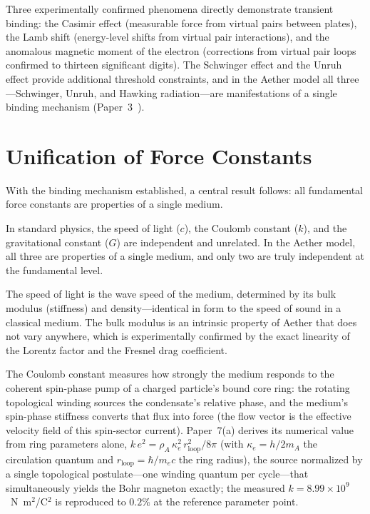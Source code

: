 \documentclass[12pt,letterpaper]{article}
\newcommand{\rhoa}{\rho_{\!A}}
\begin{document}
Three experimentally confirmed phenomena directly demonstrate transient binding:
the Casimir effect \cite{casimir1948} (measurable force from virtual pairs between
plates), the Lamb shift \cite{lamb1947} (energy-level shifts from virtual pair
interactions), and the anomalous magnetic moment of the electron (corrections from
virtual pair loops confirmed to thirteen significant digits).  The Schwinger effect
\cite{schwinger1951} and the Unruh effect \cite{unruh1976} provide additional
threshold constraints, and in the Aether model all three---Schwinger, Unruh, and
Hawking radiation---are manifestations of a single binding mechanism
(Paper~3~\cite{otto-gravity}).


\section{Unification of Force Constants}
\label{sec:force-constants}

With the binding mechanism established, a central result follows: all fundamental
force constants are properties of a single medium.

In standard physics, the speed of light ($c$), the Coulomb constant ($k$), and the
gravitational constant ($G$) are independent and unrelated.  In the Aether model, all
three are properties of a single medium, and only two are truly independent at the
fundamental level.

The speed of light is the wave speed of the medium, determined by its bulk modulus
(stiffness) and density---identical in form to the speed of sound in a classical medium.
The bulk modulus is an intrinsic property of Aether that does not vary anywhere,
which is experimentally confirmed by the exact linearity of the Lorentz factor and
the Fresnel drag coefficient.

The Coulomb constant measures how strongly the medium responds to the coherent
spin-phase pump of a charged particle's bound core ring: the rotating
topological winding sources the condensate's relative phase, and the medium's
spin-phase stiffness converts that flux into force (the flow vector is the
effective velocity field of this spin-sector current).  Paper~7(a)
\cite{otto-boundcore} derives its numerical value from ring parameters alone,
$k\,e^2 = \rhoa\,\kappa_e^2\,r_{\mathrm{loop}}^2/8\pi$ (with
$\kappa_e = h/2m_A$ the circulation quantum and
$r_{\mathrm{loop}} = \hbar/m_e c$ the ring radius), the source normalized by a
single topological postulate---one winding quantum per cycle---that
simultaneously yields the Bohr magneton exactly; the measured
$k = 8.99 \times 10^9$~N~m$^2$/C$^2$ is reproduced to $0.2\%$ at the reference
parameter point.
\end{document}
